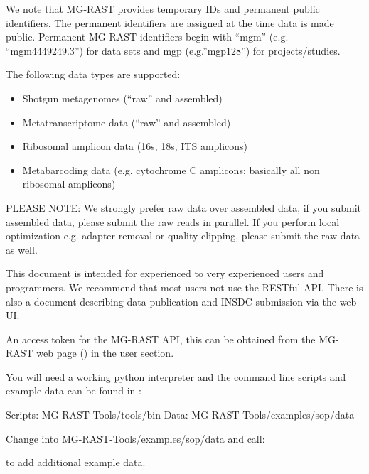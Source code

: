 \documentclass[letterpaper,10pt,english]{sphinxmanual}
\begin{document}
We note that MG-RAST provides temporary IDs and permanent public
identifiers. The permanent identifiers are assigned at the time data is
made public. Permanent MG-RAST identifiers begin with “mgm” (e.g.
“mgm4449249.3”) for data sets and mgp (e.g.”mgp128”) for
projects/studies.

The following data types are supported:
\begin{itemize}
\item {} 
Shotgun metagenomes (“raw” and assembled)

\item {} 
Metatranscriptome data (“raw” and assembled)

\item {} 
Ribosomal amplicon data (16s, 18s, ITS amplicons)

\item {} 
Metabarcoding data (e.g. cytochrome C amplicons; basically all non
ribosomal amplicons)

\end{itemize}

PLEASE NOTE: We strongly prefer raw data over assembled data, if you
submit assembled data, please submit the raw reads in parallel. If you
perform local optimization e.g. adapter removal or quality clipping,
please submit the raw data as well.

This document is intended for experienced to very experienced users and
programmers. We recommend that most users not use the RESTful API. There
is also a document describing data publication and INSDC submission via
the web UI.

An access token for the MG-RAST API, this can be obtained from the
MG-RAST web page () in the user section.

You will need a working python interpreter and the command line scripts
and example data can be found in
:

Scripts: MG-RAST-Tools/tools/bin Data: MG-RAST-Tools/examples/sop/data

Change into MG-RAST-Tools/examples/sop/data and call:

\begin{sphinxVerbatim}[commandchars=\\\{\}]
 
\end{sphinxVerbatim}

to add additional example data.
\end{document}

